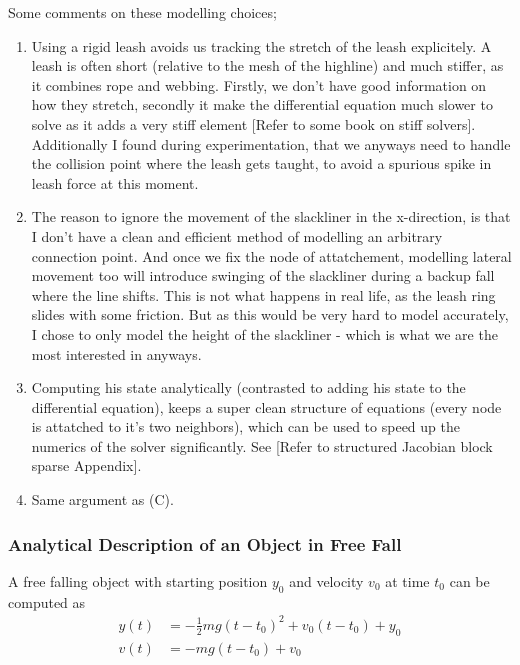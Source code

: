 \documentclass[a4paper,10pt]{article}
\begin{document}
Some comments on these modelling choices; 

\begin{enumerate}[label=(\Alph*)]
   \item Using a rigid leash avoids us tracking the stretch of the leash explicitely. A leash is often short (relative to the mesh of the highline) and much stiffer, as it combines rope and webbing. Firstly, we don't have good information on how they stretch, secondly it make the differential equation much slower to solve as it adds a very stiff element [Refer to some book on stiff solvers]. Additionally I found during experimentation, that we anyways need to handle the collision point where the leash gets taught, to avoid a spurious spike in leash force at this moment.
   \item The reason to ignore the movement of the slackliner in the x-direction, is that I don't have a clean and efficient method of modelling an arbitrary connection point. And once we fix the node of attatchement, modelling lateral movement too will introduce swinging of the slackliner during a backup fall where the line shifts. This is not what happens in real life, as the leash ring slides with some friction. But as this would be very hard to model accurately, I chose to only model the height of the slackliner - which is what we are the most interested in anyways.
   \item Computing his state analytically (contrasted to adding his state to the differential equation), keeps a super clean structure of equations (every node is attatched to it's two neighbors), which can be used to speed up the numerics of the solver significantly. See [Refer to structured Jacobian block sparse Appendix].
   \item Same argument as (C).
\end{enumerate}
%
\subsubsection{Analytical Description of an Object in Free Fall}%
\label{ssub:freefall}

A free falling object with starting position $y_0$ and velocity $v_0$ at time $t_0$ can be computed as
\begin{subequations}
\begin{align}
   y(t) &= -\frac{1}{2} m g (t - t_0)^2 + v_0 (t - t_0) + y_0 \\
   v(t) &= -m g (t - t_0) + v_0
\end{align}
\end{subequations}
\end{document}

